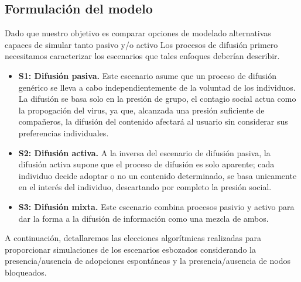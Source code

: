 \documentclass{article}
\begin{document}
\subsection{Formulación del modelo}
Dado que nuestro objetivo es comparar opciones de modelado alternativas capaces de simular tanto pasivo y/o activo Los procesos de difusión primero necesitamos caracterizar los escenarios que tales enfoques deberían describir.
\begin{itemize}
	\item \textbf{S1: Difusión pasiva.} Este escenario asume que un proceso de difusión genérico se lleva a cabo independientemente de la voluntad de los individuos. La difusión se basa solo en la presión de grupo, el contagio social actua como la propogación del virus, ya que, alcanzada una presión suficiente de compañeros, la difusión del contenido afectará al usuario sin considerar sus preferencias individuales.
	\item \textbf{S2: Difusión activa.} A la inversa del escenario de difusión pasiva, la difusión activa supone que el proceso de difusión es solo aparente; cada individuo decide adoptar o no un contenido determinado, se basa unicamente en el interés del individuo, descartando por completo la presión social.
	\item \textbf{S3: Difusión mixta.} Este escenario combina procesos pasivio y activo para dar la forma a la difusión de información como una mezcla de ambos.
\end{itemize}
A continuación, detallaremos las elecciones algorítmicas realizadas para proporcionar simulaciones de los escenarios
esbozados considerando la presencia/ausencia de adopciones espontáneas y la presencia/ausencia de nodos bloqueados.	
\end{document}
